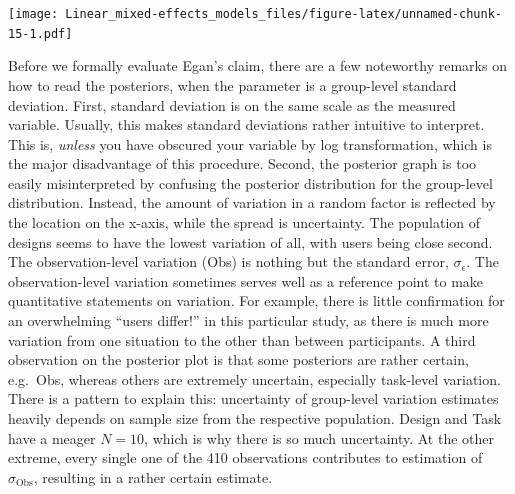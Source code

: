 \documentclass[]{svmono}
\theoremstyle{definition}
\theoremstyle{definition}
\theoremstyle{definition}
\theoremstyle{remark}
\begin{document}
\texttt{[image: Linear\_mixed-effects\_models\_files/figure-latex/unnamed-chunk-15-1.pdf]}

Before we formally evaluate Egan's claim, there are a few noteworthy
remarks on how to read the posteriors, when the parameter is a
group-level standard deviation. First, standard deviation is on the same
scale as the measured variable. Usually, this makes standard deviations
rather intuitive to interpret. This is, \emph{unless} you have obscured
your variable by log transformation, which is the major disadvantage of
this procedure. Second, the posterior graph is too easily misinterpreted
by confusing the posterior distribution for the group-level
distribution. Instead, the amount of variation in a random factor is
reflected by the location on the x-axis, while the spread is
uncertainty. The population of designs seems to have the lowest
variation of all, with users being close second. The observation-level
variation (Obs) is nothing but the standard error, \(\sigma_\epsilon\).
The observation-level variation sometimes serves well as a reference
point to make quantitative statements on variation. For example, there
is little confirmation for an overwhelming ``users differ!'' in this
particular study, as there is much more variation from one situation to
the other than between participants. A third observation on the
posterior plot is that some posteriors are rather certain, e.g.~Obs,
whereas others are extremely uncertain, especially task-level variation.
There is a pattern to explain this: uncertainty of group-level variation
estimates heavily depends on sample size from the respective population.
Design and Task have a meager \(N = 10\), which is why there is so much
uncertainty. At the other extreme, every single one of the 410
observations contributes to estimation of \(\sigma_\textrm{Obs}\),
resulting in a rather certain estimate.
\end{document}
